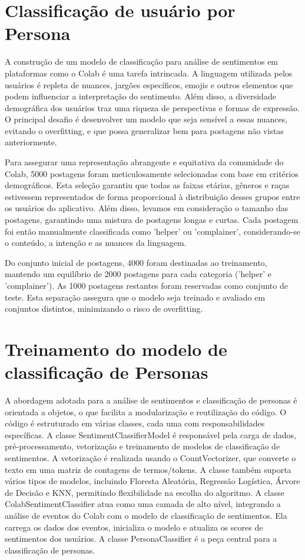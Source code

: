 \section{Classificação de usuário por Persona}

A construção de um modelo de classificação para análise de sentimentos em plataformas como o Colab é uma tarefa intrincada. A linguagem utilizada pelos usuários é repleta de nuances, jargões específicos, emojis e outros elementos que podem influenciar a interpretação do sentimento. Além disso, a diversidade demográfica dos usuários traz uma riqueza de perspectivas e formas de expressão. O principal desafio é desenvolver um modelo que seja sensível a essas nuances, evitando o overfitting, e que possa generalizar bem para postagens não vistas anteriormente.

Para assegurar uma representação abrangente e equitativa da comunidade do Colab, 5000 postagens foram meticulosamente selecionadas com base em critérios demográficos. Esta seleção garantiu que todas as faixas etárias, gêneros e raças estivessem representados de forma proporcional à distribuição desses grupos entre os usuários do aplicativo. Além disso, levamos em consideração o tamanho das postagens, garantindo uma mistura de postagens longas e curtas. Cada postagem foi então manualmente classificada como 'helper' ou 'complainer', considerando-se o conteúdo, a intenção e as nuances da linguagem.

Do conjunto inicial de postagens, 4000 foram destinadas ao treinamento, mantendo um equilíbrio de 2000 postagens para cada categoria ('helper' e 'complainer'). As 1000 postagens restantes foram reservadas como conjunto de teste. Esta separação assegura que o modelo seja treinado e avaliado em conjuntos distintos, minimizando o risco de overfitting.

\section{Treinamento do modelo de classificação de Personas}

A abordagem adotada para a análise de sentimentos e classificação de personas é orientada a objetos, o que facilita a modularização e reutilização do código. O código é estruturado em várias classes, cada uma com responsabilidades específicas. A classe SentimentClassifierModel é responsável pela carga de dados, pré-processamento, vetorização e treinamento de modelos de classificação de sentimentos. A vetorização é realizada usando o CountVectorizer, que converte o texto em uma matriz de contagens de termos/tokens. A classe também suporta vários tipos de modelos, incluindo Floresta Aleatória, Regressão Logística, Árvore de Decisão e KNN, permitindo flexibilidade na escolha do algoritmo. A classe ColabSentimentClassifier atua como uma camada de alto nível, integrando a análise de eventos do Colab com o modelo de classificação de sentimentos. Ela carrega os dados dos eventos, inicializa o modelo e atualiza os scores de sentimentos dos usuários. A classe PersonaClassifier é a peça central para a classificação de personas.


